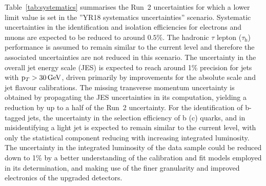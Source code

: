 Table~\ref{tab:systematics} summarises the Run~2 uncertainties for which a lower limit value is set in
the ''YR18 systematics uncertainties'' scenario. Systematic uncertainties in the identification and isolation efficiencies
for electrons and muons are expected to be reduced to around $0.5\%$. The hadronic $\tau$ lepton ($\tau_{\mathrm{h}}$) performance is assumed to remain similar to the current level and therefore the associated
uncertainties are not reduced in this scenario. The uncertainty in the overall jet energy scale (JES) is expected to
reach around 1\% precision for jets with $\mathrm{p}_{T} > 30 \,\text{Ge\hspace{-.08em}V}$, driven primarily by improvements for the
absolute scale and jet flavour calibrations. The missing transverse momentum uncertainty is obtained by propagating the JES uncertainties in its computation, yielding a reduction by up to a half of the Run~2 uncertainty. For the identification of b-tagged jets, the uncertainty in the selection efficiency of b (c) quarks, and in misidentifying a light jet is expected to remain similar to the current level, with only the statistical component reducing with increasing integrated luminosity. The uncertainty in the integrated luminosity of the data sample could be reduced down to 1\% by a better understanding of the calibration and fit models employed in its determination, and making use of the finer granularity and improved electronics of the upgraded detectors.

